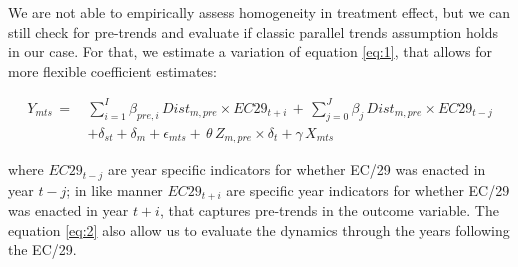 We are not able to empirically assess homogeneity in treatment effect, but we can still check for pre-trends and evaluate if classic parallel trends assumption holds in our case. For that, we estimate a variation of equation \ref{eq:1}, that allows for more flexible coefficient estimates:

\begin{equation} \label{eq:2}
\begin{aligned}
    Y_{mts} \, =  \, & \sum\limits_{i=1}^I \beta_{pre,i} \, Dist_{m,pre} \times EC29_{t+i} \, + \, \sum\limits_{j=0}^J \beta_{j} \, Dist_{m,pre} \times EC29_{t-j} \\  
             & +  \delta_{st} + \delta_m + \epsilon_{mts} + \, \theta \, Z_{m,pre} \times \delta_{t} + \gamma \, X_{mts}
\end{aligned}
\end{equation}

where $EC29_{t-j}$ are year specific indicators for whether EC/29 was enacted in year $t-j$; in like manner $EC29_{t+i}$ are specific year indicators for whether EC/29 was enacted in year $t+i$, that captures pre-trends in the outcome variable. The equation \ref{eq:2} also allow us to evaluate the dynamics through the years following the EC/29. 







